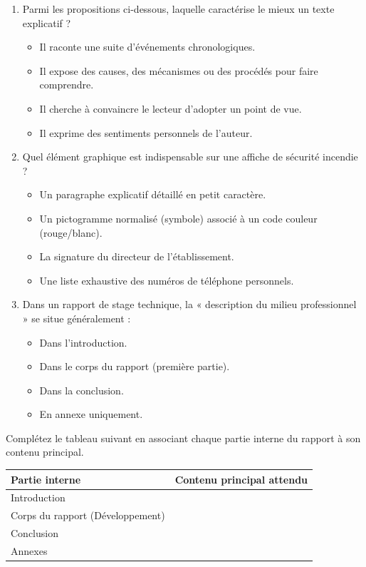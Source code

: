 \documentclass[11pt]{article}
\begin{document}
\begin{exercice}
\begin{enumerate}
    \item Parmi les propositions ci-dessous, laquelle caractérise le mieux un texte explicatif ?
    \begin{itemize}
        \item[A.] Il raconte une suite d'événements chronologiques.
        \item[B.] Il expose des causes, des mécanismes ou des procédés pour faire comprendre.
        \item[C.] Il cherche à convaincre le lecteur d'adopter un point de vue.
        \item[D.] Il exprime des sentiments personnels de l'auteur.
    \end{itemize}
    \item Quel élément graphique est indispensable sur une affiche de sécurité incendie ?
    \begin{itemize}
        \item[A.] Un paragraphe explicatif détaillé en petit caractère.
        \item[B.] Un pictogramme normalisé (symbole) associé à un code couleur (rouge/blanc).
        \item[C.] La signature du directeur de l'établissement.
        \item[D.] Une liste exhaustive des numéros de téléphone personnels.
    \end{itemize}
    \item Dans un rapport de stage technique, la « description du milieu professionnel » se situe généralement :
    \begin{itemize}
        \item[A.] Dans l'introduction.
        \item[B.] Dans le corps du rapport (première partie).
        \item[C.] Dans la conclusion.
        \item[D.] En annexe uniquement.
    \end{itemize}
\end{enumerate}
\end{exercice}

\begin{exercice}
Complétez le tableau suivant en associant chaque partie interne du rapport à son contenu principal.

\begin{tabular}{|p{3.5cm}|p{11cm}|}
\hline
\textbf{Partie interne} & \textbf{Contenu principal attendu} \\
\hline
Introduction & \dotfill \\
\hline
Corps du rapport (Développement) & \dotfill \\
\hline
Conclusion & \dotfill \\
\hline
Annexes & \dotfill \\
\hline
\end{tabular}
\end{exercice}
\end{document}
